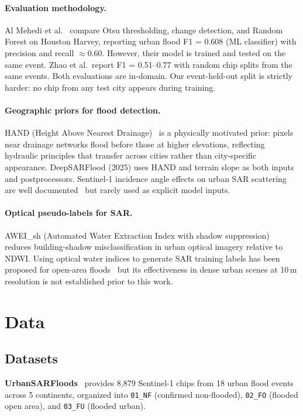 \documentclass[10pt,twocolumn]{article}
\begin{document}
\paragraph{Evaluation methodology.}
Al Mehedi et al.~\cite{almehedi2025} compare Otsu thresholding,
change detection, and Random Forest on Houston Harvey, reporting urban
flood F1 = 0.608 (ML classifier) with precision and recall
$\approx 0.60$.  However, their model is trained and tested on the
same event.  Zhao et al.\ report F1 = 0.51--0.77 with random chip
splits from the same events.  Both evaluations are in-domain.  Our
event-held-out split is strictly harder: no chip from any test city
appears during training.

\paragraph{Geographic priors for flood detection.}
HAND (Height Above Nearest Drainage)~\cite{renno2008} is a physically
motivated prior: pixels near drainage networks flood before those at
higher elevations, reflecting hydraulic principles that transfer across
cities rather than city-specific appearance.
DeepSARFlood (2025) uses HAND and terrain slope as both inputs and
postprocessors.  Sentinel-1 incidence angle effects on urban SAR
scattering are well documented~\cite{moreira2013} but rarely used as
explicit model inputs.

\paragraph{Optical pseudo-labels for SAR.}
AWEI\_sh (Automated Water Extraction Index with shadow
suppression)~\cite{feyisa2014} reduces building-shadow
misclassification in urban optical imagery relative to NDWI.
Using optical water indices to generate SAR training labels has been
proposed for open-area floods~\cite{bonafilia2020} but its
effectiveness in dense urban scenes at 10\,m resolution is not
established prior to this work.

\section{Data}

\subsection{Datasets}

\textbf{UrbanSARFloods}~\cite{zhao2024} provides 8,879 Sentinel-1
chips from 18 urban flood events across 5 continents, organized into
\texttt{01\_NF} (confirmed non-flooded), \texttt{02\_FO} (flooded
open area), and \texttt{03\_FU} (flooded urban).
\end{document}
